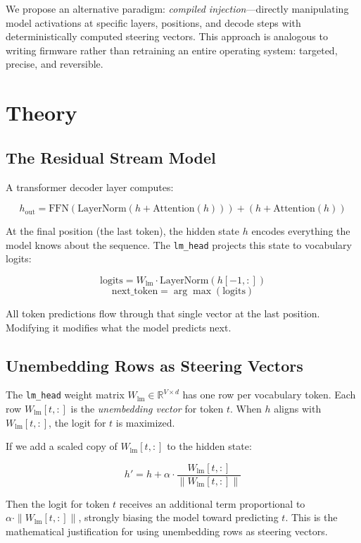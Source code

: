 \documentclass[11pt,a4paper]{article}
\begin{document}
We propose an alternative paradigm: \emph{compiled injection}---directly manipulating model activations at specific layers, positions, and decode steps with deterministically computed steering vectors. This approach is analogous to writing firmware rather than retraining an entire operating system: targeted, precise, and reversible.

\section{Theory}

\subsection{The Residual Stream Model}

A transformer decoder layer computes:

\[
h_{\text{out}} = \text{FFN}(\text{LayerNorm}(h + \text{Attention}(h))) + (h + \text{Attention}(h))
\]

At the final position (the last token), the hidden state $h$ encodes everything the model knows about the sequence. The \texttt{lm\_head} projects this state to vocabulary logits:

\[
\text{logits} = W_{\text{lm}} \cdot \text{LayerNorm}(h[-1,:])
\]
\[
\text{next\_token} = \arg\max(\text{logits})
\]

All token predictions flow through that single vector at the last position. Modifying it modifies what the model predicts next.

\subsection{Unembedding Rows as Steering Vectors}

The \texttt{lm\_head} weight matrix $W_{\text{lm}} \in \mathbb{R}^{V \times d}$ has one row per vocabulary token. Each row $W_{\text{lm}}[t,:]$ is the \emph{unembedding vector} for token $t$. When $h$ aligns with $W_{\text{lm}}[t,:]$, the logit for $t$ is maximized.

If we add a scaled copy of $W_{\text{lm}}[t,:]$ to the hidden state:

\[
h' = h + \alpha \cdot \frac{W_{\text{lm}}[t,:]}{\|W_{\text{lm}}[t,:]\|}
\]

Then the logit for token $t$ receives an additional term proportional to $\alpha \cdot \|W_{\text{lm}}[t,:]\|$, strongly biasing the model toward predicting $t$. This is the mathematical justification for using unembedding rows as steering vectors.
\end{document}
